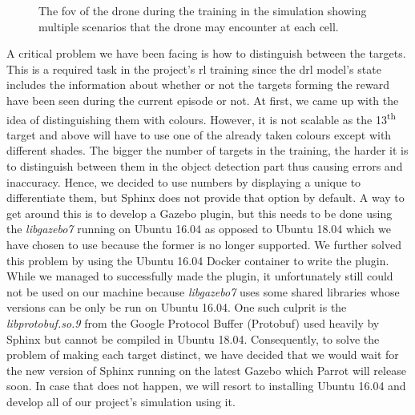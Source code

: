 \documentclass[../main.tex]{subfiles}
\begin{document}
\begin{figure}[tb]%
    \centering
    \hspace{0.2cm}
    \hspace{0.2cm}
    \caption{%
        \protect The \gls{fov} of the \anafi drone
        during the training in the simulation
        showing multiple scenarios that the drone
        may encounter at each cell.}%
    \label{fig:fov}%
\end{figure}

A critical problem we have been facing 
is how to distinguish
between the targets. This is a required task in the
project's \gls{rl} training since 
the \gls{drl} model's state
includes the information about whether or not
the targets forming the reward have been seen 
during the current episode or not. 
At first, we came up with the idea of distinguishing them
with colours. However, it is not scalable 
as the 13\textsuperscript{th}
target and above will have to use 
one of the already taken colours
except with different shades. The bigger the number of
targets in the training, the harder it is to
distinguish between them in the object detection part
thus causing errors and inaccuracy. Hence, we decided
to use numbers by displaying a unique \id
to differentiate them, but
Sphinx does not provide that option by default.
A way to get around this is to develop a Gazebo plugin,
but this needs to be done using the \textit{libgazebo7} running
on Ubuntu 16.04 as opposed to Ubuntu 18.04 which we 
have chosen to use because the former 
is no longer supported.
We further solved this problem by using the Ubuntu 16.04
Docker container to write the plugin. While we managed
to successfully made the plugin, it unfortunately still
could not be used on our machine because \textit{libgazebo7}
uses some shared libraries whose versions can be only 
be run on Ubuntu 16.04. One such culprit is the 
\textit{libprotobuf.so.9} from the Google Protocol Buffer 
(Protobuf) used heavily by Sphinx but cannot be compiled
in Ubuntu 18.04. Consequently, 
to solve the problem of making each target distinct, 
we have decided that we would wait for the new
version of Sphinx running on the latest Gazebo
which Parrot will release soon. In case that does
not happen,
we will resort to installing Ubuntu 16.04 and develop
all of our project's simulation using it.
\end{document}
